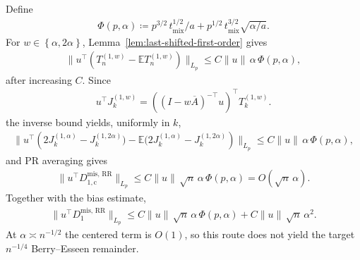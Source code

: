 Define
\begin{equation}
\begin{aligned}
\Phi(p, \alpha) \coloneqq p^{3 / 2} \, t_{\text{mix}}^{1 / 2} / a
                + p^{1 / 2} \, t_{\text{mix}}^{3 / 2} \sqrt{\alpha / a}.
\end{aligned}
\end{equation}
For \(w \in \left\{\alpha, 2 \alpha\right\}\), Lemma~\ref{lem:last-shifted-first-order} gives
\begin{equation}
\begin{aligned}
\lVert u^\top (T_n^{(1, w)} - \mathbb{E} T_n^{(1, w)}) \rVert_{L_p}
  \le C \lVert u \rVert \, \alpha \, \Phi(p, \alpha),
\end{aligned}
\end{equation}
after increasing \(C\). Since
\begin{equation}
\begin{aligned}
u^\top J_k^{(1, w)}
  = ((I - w \overline{A})^{-\top} u)^\top T_k^{(1, w)}.
\end{aligned}
\end{equation}
the inverse bound yields, uniformly in \(k\),
\begin{equation}
\begin{aligned}
\lVert u^\top \left(2 J_k^{(1, \alpha)} - J_k^{(1, 2 \alpha)})
     - \mathbb{E} (2 J_k^{(1, \alpha)} - J_k^{(1, 2 \alpha)}\right) \rVert_{L_p}
  \le C \lVert u \rVert \, \alpha \, \Phi(p, \alpha),
\end{aligned}
\end{equation}
and PR averaging gives
\begin{equation}
\begin{aligned}
\lVert u^\top D_{1, \text{c}}^{\text{mis, RR}} \rVert_{L_p}
  \le C \lVert u \rVert \, \sqrt{n} \, \alpha \, \Phi(p, \alpha)
  = O(\sqrt{n} \, \alpha).
\end{aligned}
\end{equation}
Together with the bias estimate,
\begin{equation}
\begin{aligned}
\lVert u^\top D_1^{\text{mis, RR}} \rVert_{L_p}
  \le C \lVert u \rVert \, \sqrt{n} \, \alpha \, \Phi(p, \alpha)
    + C \lVert u \rVert \, \sqrt{n} \, \alpha^2.
\end{aligned}
\end{equation}
At \(\alpha \asymp n^{-1 / 2}\) the centered term is \(O(1)\), so this route does
not yield the target \(n^{-1 / 4}\) Berry--Esseen remainder.
